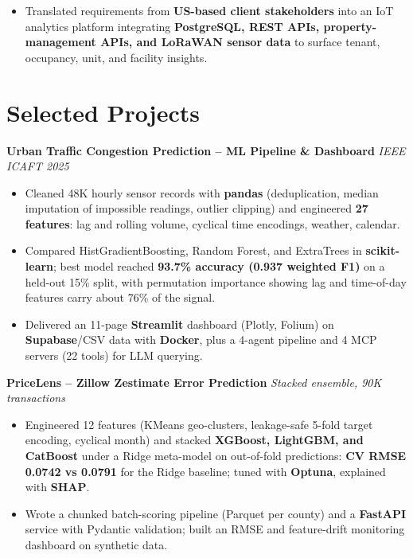 \documentclass[11pt]{extarticle}
\begin{document}
\begin{itemize}
    \item Translated requirements from \textbf{US-based client stakeholders} into an IoT analytics platform integrating \textbf{PostgreSQL, REST APIs, property-management APIs, and LoRaWAN sensor data} to surface tenant, occupancy, unit, and facility insights.
\end{itemize}


\section*{Selected Projects}

\textbf{Urban Traffic Congestion Prediction -- ML Pipeline \& Dashboard}
\hfill \textit{IEEE ICAFT 2025}

\begin{itemize}
    \item Cleaned 48K hourly sensor records with \textbf{pandas} (deduplication, median imputation of impossible readings, outlier clipping) and engineered \textbf{27 features}: lag and rolling volume, cyclical time encodings, weather, calendar.
    \item Compared HistGradientBoosting, Random Forest, and ExtraTrees in \textbf{scikit-learn}; best model reached \textbf{93.7\% accuracy (0.937 weighted F1)} on a held-out 15\% split, with permutation importance showing lag and time-of-day features carry about 76\% of the signal.
    \item Delivered an 11-page \textbf{Streamlit} dashboard (Plotly, Folium) on \textbf{Supabase}/CSV data with \textbf{Docker}, plus a 4-agent pipeline and 4 MCP servers (22 tools) for LLM querying.
\end{itemize}

\vspace{3pt}

\textbf{PriceLens -- Zillow Zestimate Error Prediction}
\hfill \textit{Stacked ensemble, 90K transactions}

\begin{itemize}
    \item Engineered 12 features (KMeans geo-clusters, leakage-safe 5-fold target encoding, cyclical month) and stacked \textbf{XGBoost, LightGBM, and CatBoost} under a Ridge meta-model on out-of-fold predictions: \textbf{CV RMSE 0.0742 vs 0.0791} for the Ridge baseline; tuned with \textbf{Optuna}, explained with \textbf{SHAP}.
    \item Wrote a chunked batch-scoring pipeline (Parquet per county) and a \textbf{FastAPI} service with Pydantic validation; built an RMSE and feature-drift monitoring dashboard on synthetic data.
\end{itemize}
\end{document}
